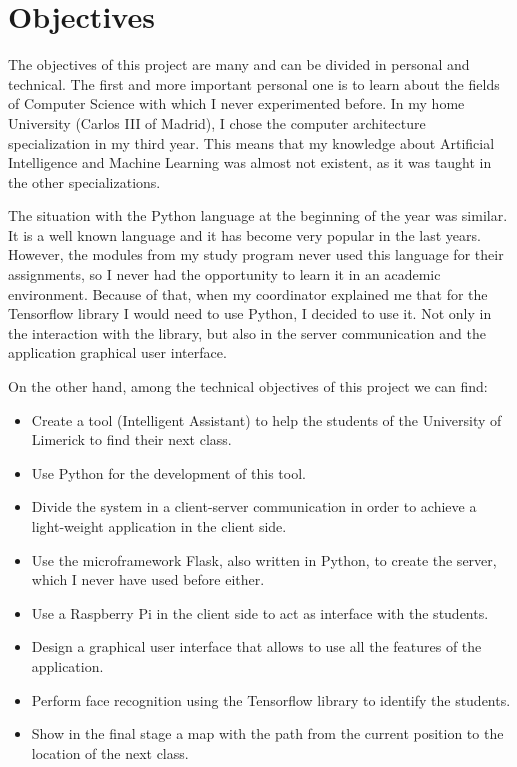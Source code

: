 \section{Objectives}
The objectives of this project are many and can be divided in personal and technical. The first and more important personal one is to learn about the fields of Computer Science with which I never experimented before. In my home University (Carlos III of Madrid), I chose the computer architecture specialization in my third year. This means that my knowledge about Artificial Intelligence and Machine Learning was almost not existent, as it was taught in the other specializations. 

The situation with the Python language at the beginning of the year was similar. It is a well known language and it has become very popular in the last years. However, the modules from my study program never used this language for their assignments, so I never had the opportunity to learn it in an academic environment. Because of that, when my coordinator explained me that for the Tensorflow library I would need to use Python, I decided to use it. Not only in the interaction with the library, but also in the server communication and the application graphical user interface.

On the other hand, among the technical objectives of this project we can find:

\begin{itemize}
	\item Create a tool (Intelligent Assistant) to help the students of the University of Limerick to find their next class.
	\item Use Python for the development of this tool.
	\item Divide the system in a client-server communication in order to achieve a light-weight application in the client side.
	\item Use the microframework Flask, also written in Python, to create the server, which I never have used before either.
	\item Use a Raspberry Pi in the client side to act as interface with the students.
	\item Design a graphical user interface that allows to use all the features of the application.
	\item Perform face recognition using the Tensorflow library to identify the students.
	\item Show in the final stage a map with the path from the current position to the location of the next class.
\end{itemize}

